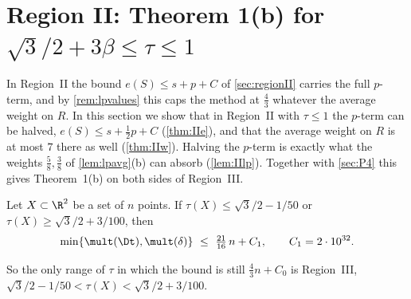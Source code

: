 %

\section{Region II: Theorem 1(b) for \texorpdfstring{$\sqrt3/2+3\beta\le\tau\le1$}{sqrt3/2 + 3 beta <= tau <= 1}}\label{sec:II}

In Region~II the bound $e(S)\le s+p+C$ of \cref{sec:regionII} carries the full $p$-term, and by \cref{rem:lpvalues} this caps the method at $\frac43$ whatever the average weight on $R$. In this section we show that in Region~II with $\tau\le1$ the $p$-term can be halved, $e(S)\le s+\frac12p+C$ (\cref{thm:IIe}), and that the average weight on $R$ is at most $7$ there as well (\cref{thm:IIw}). Halving the $p$-term is exactly what the weights $\frac58,\frac38$ of \cref{lem:lpavg}(b) can absorb (\cref{lem:IIlp}). Together with \cref{sec:P4} this gives Theorem~1(b) on both sides of Region~III.

\begin{theorem}\label{thm:IIone}
Let $X\subset\R^2$ be a set of $n$ points. If $\tau(X)\le\sqrt3/2-1/50$ or $\tau(X)\ge\sqrt3/2+3/100$, then
\[
\min\{\mult(\Dt),\mult(\delta)\}\ \le\ \tfrac{21}{16}\,n+C_1,\qquad C_1=2\cdot10^{32}.
\]
\end{theorem}
So the only range of $\tau$ in which the bound is still $\frac43n+C_0$ is Region~III, $\sqrt3/2-1/50<\tau(X)<\sqrt3/2+3/100$.

